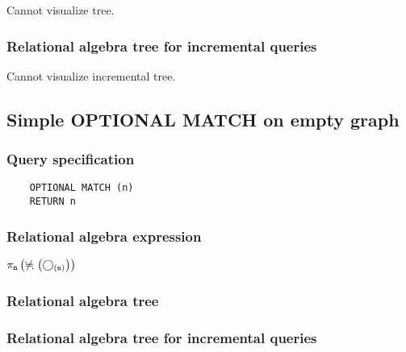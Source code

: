 	Cannot visualize tree.

	\subsubsection*{Relational algebra tree for incremental queries}

	Cannot visualize incremental tree.
	\subsection{Simple OPTIONAL MATCH on empty graph}

	\subsubsection*{Query specification}

	\begin{lstlisting}
	OPTIONAL MATCH (n)
	RETURN n
	\end{lstlisting}


	\subsubsection*{Relational algebra expression}

	$\projection{\var{n}} \left(\alldifferent{} \left(\getvertices{n}{}\right)\right)$

	\subsubsection*{Relational algebra tree}


	\subsubsection*{Relational algebra tree for incremental queries}

